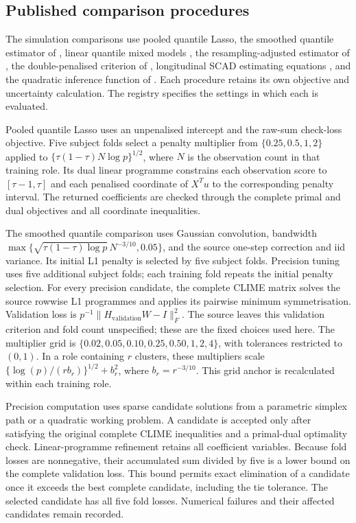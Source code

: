 \subsection{Published comparison procedures}

The simulation comparisons use pooled quantile Lasso, the smoothed
quantile estimator of , linear quantile mixed models
\cite{geraci2014,geraci2014jss}, the resampling-adjusted estimator of
, the double-penalised criterion of
, longitudinal SCAD estimating equations
\cite{zu2023}, and the quadratic inference function of
. Each procedure retains its own objective
and uncertainty calculation. The registry specifies the settings
in which each is evaluated.

Pooled quantile Lasso uses an unpenalised intercept and the raw-sum
check-loss objective. Five subject folds select a penalty multiplier
from $\{0.25,0.5,1,2\}$ applied to
$\{\tau(1-\tau)N\log p\}^{1/2}$, where $N$ is the observation
count in that training role. Its dual linear programme constrains
each observation score to $[\tau-1,\tau]$ and each penalised
coordinate of $X^Tu$ to the corresponding penalty interval.
The returned coefficients are checked through the complete primal
and dual objectives and all coordinate inequalities.

The smoothed quantile comparison uses Gaussian convolution,
bandwidth $\max\{\sqrt{\tau(1-\tau)\log p}\,N^{-3/10},0.05\}$,
and the source one-step correction and iid variance. Its initial
L1 penalty is selected by five subject folds. Precision tuning
uses five additional subject folds; each training fold repeats
the initial penalty selection. For every precision candidate,
the complete CLIME matrix solves the source rowwise L1 programmes
and applies its pairwise minimum symmetrisation. Validation loss
is $p^{-1}\|H_{\mathrm{validation}}W-I\|_F^2$. The source leaves
this validation criterion and fold count unspecified; these are
the fixed choices used here. The multiplier grid is
$\{0.02,0.05,0.10,0.25,0.50,1,2,4\}$, with tolerances restricted
to $(0,1)$. In a role containing $r$ clusters, these multipliers
scale $\{\log(p)/(r b_r)\}^{1/2}+b_r^2$, where $b_r=r^{-3/10}$.
This grid anchor is recalculated within each training role.

Precision computation uses sparse candidate solutions from a
parametric simplex path or a quadratic working problem. A candidate
is accepted only after satisfying the original complete CLIME
inequalities and a primal-dual optimality check. Linear-programme
refinement retains all coefficient variables. Because fold losses
are nonnegative, their accumulated sum divided by five is a lower
bound on the complete validation loss. This bound permits exact
elimination of a candidate once it exceeds the best complete
candidate, including the tie tolerance. The selected candidate
has all five fold losses. Numerical failures and their affected
candidates remain recorded.


